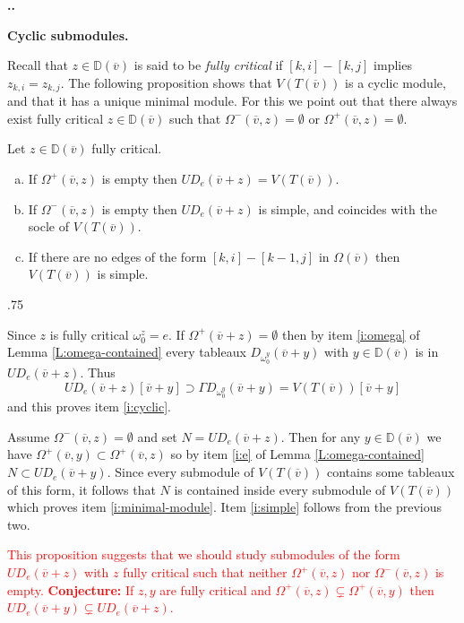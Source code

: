 \documentclass[11pt,fleqn]{amsart}
\makeatletter
\renewcommand\thesection{\arabic{section}}
\renewcommand\proofname{Proof}
\renewenvironment{proof}[1][\textit{\proofname}]{\par
 \pushQED{\qed}%
 \normalfont \topsep.75\paraskip\relax
 \trivlist
 \item[\hskip\labelsep
 \itshape
 #1\@addpunct{.}]\ignorespaces
}{%
 \popQED\endtrivlist\@endpefalse
}
\newcounter{para}[section]
\renewcommand\thepara{\thesection.\arabic{para}}
\def\paragraph{%
 \noindent
 \refstepcounter{para}%
 \textbf{\thepara.}\hspace{1ex}%
}
\newcommand\about[1]{%
 {\bfseries#1.}%
}
\newcommand\vv{\overline{v}}
\newcommand\DD{\mathbb D}
\makeatother
\begin{document}
\paragraph
\about{Cyclic submodules}
Recall that $z \in \DD(\vv)$ is said to be \emph{fully critical} if $[k,i] - 
[k,j]$ implies $z_{k,i} = z_{k,j}$. The following proposition shows that 
$V(T(\vv))$ is a cyclic module, and that it has a unique minimal module. For 
this we point out that there always exist fully critical $z \in \DD(\vv)$ 
such that $\Omega^-(\vv,z) = \emptyset$ or $\Omega^+(\vv,z) = \emptyset$.
\begin{Proposition}
\label{P:cyclic}
Let $z \in \DD(\vv)$ fully critical.
\begin{enumerate}[(a)]
\item 
\label{i:cyclic}
If $\Omega^+(\vv, z)$ is empty then $U D_e(\vv + z) = V(T(\vv))$.

\item
\label{i:minimal-module}
If $\Omega^-(\vv,z)$ is empty then $U D_e(\vv + z)$ is simple, and coincides 
with the socle of $V(T(\vv))$.

\item
\label{i:simple}
If there are no edges of the form $[k,i] - [k-1,j]$ in $\Omega(\vv)$ then
$V(T(\vv))$ is simple.
\end{enumerate}
\end{Proposition}
\begin{proof}
Since $z$ is fully critical $\omega_0^z = e$. If $\Omega^+(\vv + z) = 
\emptyset$ then by item \ref{i:omega} of Lemma \ref{L:omega-contained} every
tableaux $D_{\omega_0^y}(\vv + y)$ with $y \in \DD(\vv)$ is in $U D_e(\vv+z)$.
Thus 
\[
U D_e(\vv+z)[\vv + y] 
	\supset \Gamma D_{\omega_0^y}(\vv+y) 
	= V(T(\vv))[\vv+y]
\]
and this proves item \ref{i:cyclic}.

Assume $\Omega^-(\vv,z) = \emptyset$ and set $N = U D_e(\vv + z)$. Then 
for any $y \in \DD(\vv)$ we have $\Omega^+(\vv,y) \subset \Omega^+(\vv,z)$ so
by item \ref{i:e} of Lemma \ref{L:omega-contained} $N \subset U D_e(\vv + y)$.
Since every submodule of $V(T(\vv))$ contains some tableaux of this form, it
follows that $N$ is contained inside every submodule of $V(T(\vv))$ which 
proves item \ref{i:minimal-module}. Item \ref{i:simple} follows from the 
previous two.
\end{proof}

\textcolor{red}{This proposition suggests that we should study submodules of 
the form $U D_e(\vv+z)$ with $z$ fully critical such that neither 
$\Omega^+(\vv,z)$ nor $\Omega^-(\vv,z)$ is empty. \textbf{Conjecture:} If $z,y$
are fully critical and $\Omega^+(\vv,z) \subsetneq \Omega^+(\vv,y)$ then 
$UD_e(\vv + y) \subsetneq UD_e(\vv + z)$.}
\end{document}
